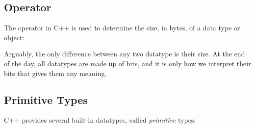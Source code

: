 \documentclass{article}
\begin{document}
\subsection{ Operator}

\noindent
The  operator in C++ is used to determine the size, in bytes, of a data type or object:


\noindent
Arguably, the only difference between any two datatype is their size. At the end of the day, all datatypes are made up of bits, and it is only how we interpret their bits that gives them any meaning.

\subsection{Primitive Types}

\noindent
C++ provides several built-in datatypes, called \textit{primitive} types:
\end{document}
